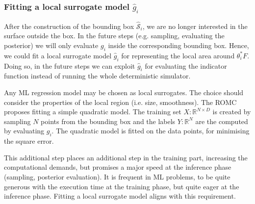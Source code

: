 \subsubsection*{Fitting a local surrogate model $\hat{g}_i$}

After the construction of the bounding box $\mathcal{\hat{S}}_i$, we
are no longer interested in the surface outside the box. In the future
steps (e.g. sampling, evaluating the posterior) we will only evaluate
$g_i$ inside the corresponding bounding box. Hence, we could fit a
local surrogate model $\hat{g}_i$ for representing the local area
around $\theta_i^*F$. Doing so, in the future steps we can exploit
$\hat{g}_i$ for evaluating the indicator function instead of running
the whole deterministic simulator.

Any ML regression model may be chosen as local surrogates. The choice
should consider the properties of the local region (i.e. size,
smoothness). The ROMC proposes fitting a simple quadratic model. The
training set $X: \mathbb{R}^{N \times D}$ is created by sampling $N$
points from the bounding box and the labels $Y: \mathbb{R}^{N}$ are
the computed by evaluating $g_i$. The quadratic model is fitted on the
data points, for minimising the square error.


This additional step places an
additional step in the training part, increasing the computational
demands, but promises a major speed at the inference phase (sampling,
posterior evaluation). It is frequent in ML problems, to be quite
generous with the execution time at the training phase, but quite
eager at the inference phase. Fitting a local surrogate model aligns
with this requirement.
